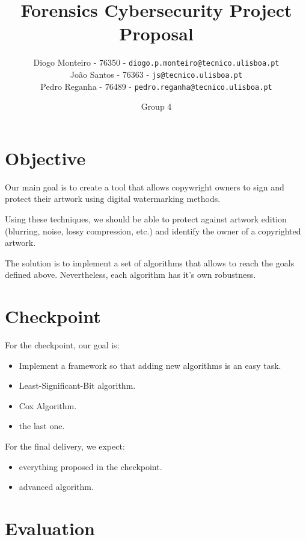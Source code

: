 \documentclass[10pt]{article}
\begin{document}
\title{Forensics Cybersecurity Project Proposal}
\author{
    Diogo Monteiro - 76350 - \texttt{diogo.p.monteiro@tecnico.ulisboa.pt} \\
    João Santos - 76363 - \texttt{js@tecnico.ulisboa.pt} \\
    Pedro Reganha - 76489 - \texttt{pedro.reganha@tecnico.ulisboa.pt} \\
}
\date{Group 4}
\maketitle

\section{Objective}
    Our main goal is to create a tool that allows copywright owners to sign and protect their artwork using digital watermarking methods.
    
    Using these techniques, we should be able to protect against artwork edition (blurring, noise, lossy compression, etc.) and identify the owner of a copyrighted artwork.
    
    The solution is to implement a set of algorithms that allows to reach the goals defined above. Nevertheless, each algorithm has it's own robustness.
\section{Checkpoint}
For the checkpoint, our goal is:

	\begin{itemize}
    	\item Implement a framework so that adding new algorithms is an easy task.
        \item Least-Significant-Bit algorithm.
        \item Cox Algorithm.
        \item the last one.	
    \end{itemize}
    
    For the final delivery, we expect:
    \begin{itemize}
    	\item everything proposed in the checkpoint.
        \item advanced algorithm.
    \end{itemize}
    
\section{Evaluation}
\end{document}
